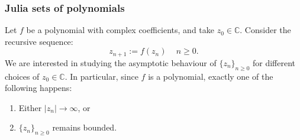 \documentclass{beamer} %
\theoremstyle{definition} %
\newcommand{\Cplx}{\mathbb{C}}
\begin{document}
\begin{frame}\frametitle{Julia sets of polynomials}
    Let $f$ be a polynomial with complex coefficients, and take
    $z_0 \in \Cplx$. Consider the recursive sequence:
    \begin{equation*}
        z_{n+1} := f(z_n)\,\quad n\geq 0.
    \end{equation*}
    We are interested in studying the asymptotic behaviour of $\{z_n\}_{n\geq 0}$
    for different choices of $z_0 \in \Cplx$. In particular, since $f$ is a polynomial, exactly one of the following happens:
    \begin{enumerate}
        \item{} Either $|z_n| \to\infty$, or
        \item{} $\{z_n\}_{n\geq 0}$ remains bounded.
    \end{enumerate}
\end{frame}
% 
% 
% 
\end{document}

